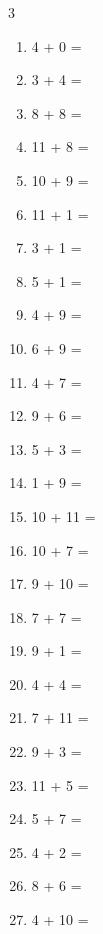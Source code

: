 \documentclass[a4paper, 11pt]{article}
\begin{document}
\begin{multicols}{3}
\begin{enumerate}
      \item 4 + 0 = \dotfill\bigskip
      \item 3 + 4 = \dotfill\bigskip
      \item 8 + 8 = \dotfill\bigskip
      \item 11 + 8 = \dotfill\bigskip
      \item 10 + 9 = \dotfill\bigskip
      \item 11 + 1 = \dotfill\bigskip
      \item 3 + 1 = \dotfill\bigskip
      \item 5 + 1 = \dotfill\bigskip
      \item 4 + 9 = \dotfill
      \item 6 + 9 = \dotfill\bigskip
      \item 4 + 7 = \dotfill\bigskip
      \item 9 + 6 = \dotfill\bigskip
      \item 5 + 3 = \dotfill\bigskip
      \item 1 + 9 = \dotfill\bigskip
      \item 10 + 11 = \dotfill\bigskip
      \item 10 + 7 = \dotfill\bigskip
      \item 9 + 10 = \dotfill\bigskip
      \item 7 + 7 = \dotfill\bigskip
      \item 9 + 1 = \dotfill\bigskip
      \item 4 + 4 = \dotfill\bigskip
      \item 7 + 11 = \dotfill\bigskip
      \item 9 + 3 = \dotfill\bigskip
      \item 11 + 5 = \dotfill\bigskip
      \item 5 + 7 = \dotfill\bigskip
      \item 4 + 2 = \dotfill\bigskip
      \item 8 + 6 = \dotfill\bigskip
      \item 4 + 10 = \dotfill
    \end{enumerate}
\end{multicols}
\end{document}
